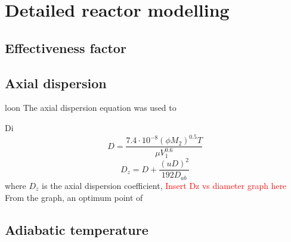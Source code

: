 \section{Detailed reactor modelling}
\subsection{Effectiveness factor}

\subsection{Axial dispersion}
loon
The axial dispersion equation was used to 

Di
\begin{equation}
    D=\frac{7.4\cdot10^{-8}(\phi M_2)^{0.5}T}{\mu V_1^{0.6}}
    \label{wilkechang}
\end{equation}
\begin{equation}
    D_z=D+\frac{(uD)^2}{192D_{ab}}
    \label{axial dispersion coefficient}
\end{equation}
where $D_z$ is the axial dispersion coefficient, 
\textcolor{red}{Insert Dz vs diameter graph here} 
From the graph, an optimum point of 
\subsection{Adiabatic temperature}